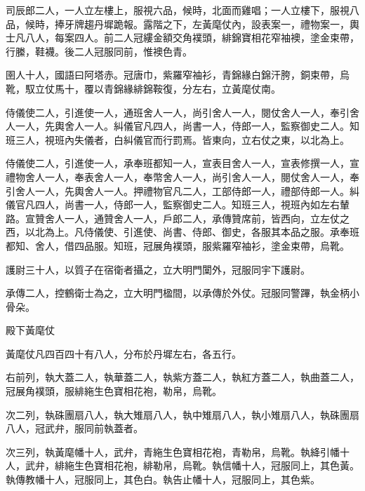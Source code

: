 \begin{pinyinscope}
 司辰郎二人，一人立左樓上，服視六品，候時，北面而雞唱；一人立樓下，服視八品，候時，捧牙牌趨丹墀跪報。露階之下，左黃麾仗內，設表案一，禮物案一，輿士凡八人，每案四人。前二人冠縷金額交角襆頭，緋錦寶相花窄袖襖，塗金束帶，行縢，鞋襪。後二人冠服同前，惟襖色青。



 圉人十人，國語曰阿塔赤。冠唐巾，紫羅窄袖衫，青錦緣白錦汗胯，銅束帶，烏靴，馭立仗馬十，覆以青錦緣緋錦鞍復，分左右，立黃麾仗南。



 侍儀使二人，引進使一人，通班舍人一人，尚引舍人一人，閱仗舍人一人，奉引舍人一人，先輿舍人一人。糾儀官凡四人，尚書一人，侍郎一人，監察御史二人。知班三人，視班內失儀者，白糾儀官而行罰焉。皆東向，立右仗之東，以北為上。



 侍儀使二人，引進使一人，承奉班都知一人，宣表目舍人一人，宣表修撰一人，宣禮物舍人一人，奉表舍人一人，奉幣舍人一人，尚引舍人一人，閱仗舍人一人，奉引舍人一人，先輿舍人一人。押禮物官凡二人，工部侍郎一人，禮部侍郎一人。糾儀官凡四人，尚書一人，侍郎一人，監察御史二人。知班三人，視班內如左右輦路。宣贊舍人一人，通贊舍人一人，戶郎二人，承傳贊席前，皆西向，立左仗之西，以北為上。凡侍儀使、引進使、尚書、侍郎、御史，各服其本品之服。承奉班都知、舍人，借四品服。知班，冠展角襆頭，服紫羅窄袖衫，塗金束帶，烏靴。



 護尉三十人，以質子在宿衛者攝之，立大明門闑外，冠服同宇下護尉。



 承傳二人，控鶴衛士為之，立大明門楹間，以承傳於外仗。冠服同警蹕，執金柄小骨朵。



 殿下黃麾仗



 黃麾仗凡四百四十有八人，分布於丹墀左右，各五行。



 右前列，執大蓋二人，執華蓋二人，執紫方蓋二人，執紅方蓋二人，執曲蓋二人，冠展角襆頭，服緋絁生色寶相花袍，勒帛，烏靴。



 次二列，執硃團扇八人，執大雉扇八人，執中雉扇八人，執小雉扇八人，執硃團扇八人，冠武弁，服同前執蓋者。



 次三列，執黃麾幡十人，武弁，青絁生色寶相花袍，青勒帛，烏靴。執絳引幡十人，武弁，緋絁生色寶相花袍，緋勒帛，烏靴。執信幡十人，冠服同上，其色黃。執傳教幡十人，冠服同上，其色白。執告止幡十人，冠服同上，其色紫。




\end{pinyinscope}
